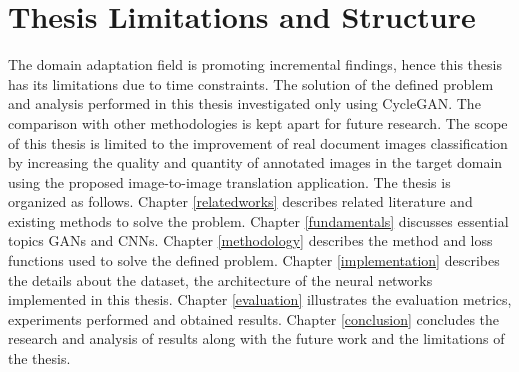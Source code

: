 \section{Thesis Limitations and Structure}\label{thesisstructurelimitations}
The domain adaptation field is promoting incremental findings, hence this thesis has its limitations due to time constraints. The solution of the defined problem and analysis performed in this thesis investigated only using \ac{CycleGAN}. The comparison with other methodologies is kept apart for future research. The scope of this thesis is limited to the improvement of real document images classification by increasing the quality and quantity of annotated images in the target domain using the proposed image-to-image translation application. The thesis is organized as follows. Chapter \ref{relatedworks} describes related literature and existing methods to solve the problem. Chapter \ref{fundamentals} discusses essential topics \acp{GAN} and \acp{CNN}. Chapter \ref{methodology} describes the method and loss functions used to solve the defined problem. Chapter \ref{implementation} describes the details about the dataset, the architecture of the neural networks implemented in this thesis. Chapter \ref{evaluation} illustrates the evaluation metrics, experiments performed and obtained results. Chapter \ref{conclusion} concludes the research and analysis of results along with the future work and the limitations of the thesis.

